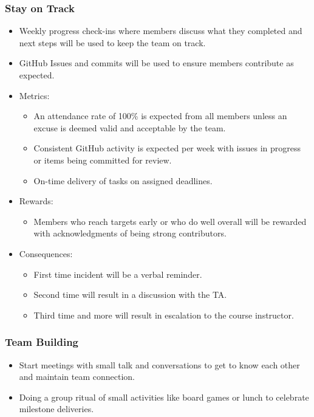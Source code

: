 \documentclass{article}
\begin{document}
\subsubsection*{Stay on Track}
\begin{itemize}
    \item Weekly progress check-ins where members discuss what they completed and next steps will be used to keep the team on track. 
    \item GitHub Issues and commits will be used to ensure members contribute as expected.
    
    \item Metrics: \begin{itemize}
        \item An attendance rate of 100\% is expected from all members unless an excuse is deemed valid and acceptable by the team.
        \item Consistent GitHub activity is expected per week with issues in progress or items being committed for review.
        \item On-time delivery of tasks on assigned deadlines.
    \end{itemize}
    \item Rewards: \begin{itemize}
        \item Members who reach targets early or who do well overall will be rewarded with acknowledgments of being strong contributors. \end{itemize}
    \item Consequences: \begin{itemize}
        \item First time incident will be a verbal reminder.
        \item Second time will result in a discussion with the TA.
        \item Third time and more will result in escalation to the course instructor.
    \end{itemize}
\end{itemize}

\subsubsection*{Team Building}
\begin{itemize}
    \item Start meetings with small talk and conversations to get to know each other and maintain team connection.
    \item Doing a group ritual of small activities like board games or lunch to celebrate milestone deliveries.
\end{itemize}
\end{document}

